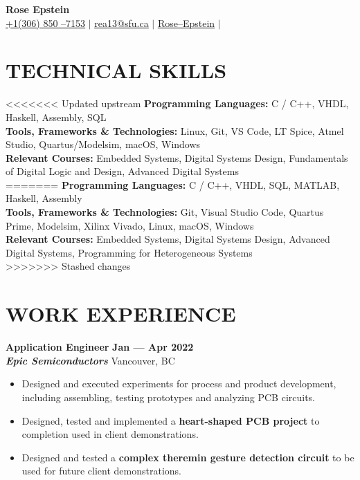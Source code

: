 \documentclass[letterpaper,11pt]{article}
\newcommand{\contact} [4] {
    \begin{center}
        \textbf{\color{colorValue}\Huge #1} \\ \vspace{1pt}
        \small {\faIcon{phone} \underline{#2}} $|$ \href{mailto:#3}{\faIcon{envelope} \underline{#3}} $|$ 
        \href{#4}{\faIcon{linkedin} \underline{Rose--Epstein}} $|$
    \end{center}
}
\newcommand{\Item} [1] {
    \item\small{{#1 \vspace{-2pt}}}
}
\newcommand{\employer} [5] {
    {\textbf{#3} \hfill \textbf{#4 --- #5}\\ \textbf{\emph{#1}} \hfill #2\\}
}
\newcommand{\workItemListStart} [0] {
    \vspace{-1pt}
    \begin{itemize}[topsep=0pt,itemsep=-2pt]
}
\newcommand{\workItemListEnd} [0] {
    \end{itemize}
    \vspace{1pt}
}
\begin{document}
    \vspace*{-30pt}

    \contact{Rose Epstein}{+1(306) 850 --7153}{rea13@sfu.ca}{https://www.linkedin.com/in/rose-epstein/}

    \section{TECHNICAL SKILLS}
    \begin{itemize}[leftmargin=0in, label={}]
    \small{\item{
<<<<<<< Updated upstream
        \textbf{Programming Languages:}{ C / C++, VHDL, Haskell, Assembly, SQL} \\
        \textbf{Tools, Frameworks \& Technologies:}{ Linux, Git, VS Code, LT Spice, Atmel Studio, Quartus/Modelsim, macOS, Windows} \\
        \textbf{Relevant Courses:}{ Embedded Systems, Digital Systems Design, Fundamentals of Digital Logic and Design, Advanced Digital Systems} \\
=======
        \textbf{Programming Languages:}{ C / C++, VHDL, SQL, MATLAB, Haskell, Assembly} \\
        \textbf{Tools, Frameworks \& Technologies:}{ Git, Visual Studio Code, Quartus Prime, Modelsim, Xilinx Vivado, Linux, macOS, Windows} \\
        \textbf{Relevant Courses:}{ Embedded Systems, Digital Systems Design, Advanced Digital Systems, Programming for Heterogeneous Systems} \\
>>>>>>> Stashed changes
    }}
    \end{itemize}

    \section{WORK EXPERIENCE}
    \employer{Epic Semiconductors}{Vancouver, BC}{Application Engineer}{Jan}{Apr 2022}
    \workItemListStart{}
        \Item{Designed and executed experiments for process and product development, including assembling, testing prototypes and analyzing PCB circuits.}
        \Item{Designed, tested and implemented a \textbf{heart-shaped PCB project} to completion used in client demonstrations.}
        \Item{Designed and tested a \textbf{complex theremin gesture detection circuit} to be used for future client demonstrations.}
        \workItemListEnd{}
\end{document}

